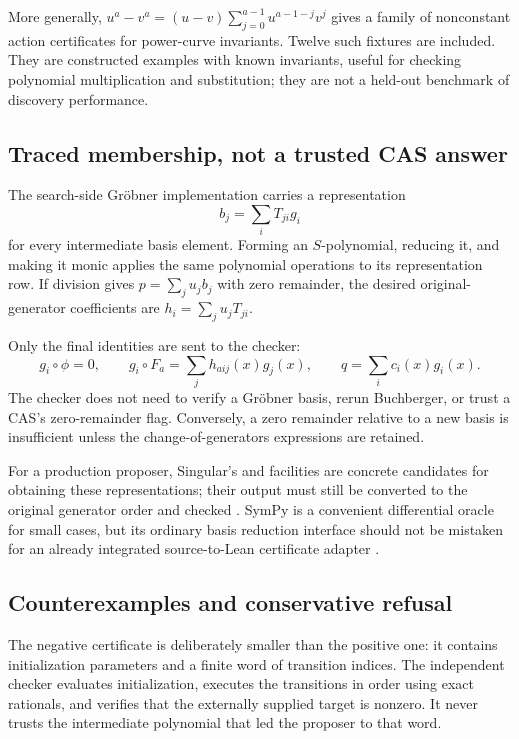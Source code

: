 More generally, $u^a-v^a=(u-v)\sum_{j=0}^{a-1}u^{a-1-j}v^j$ gives a family of
nonconstant action certificates for power-curve invariants. Twelve such fixtures
are included. They are constructed examples with known invariants, useful for
checking polynomial multiplication and substitution; they are not a held-out
benchmark of discovery performance.

\subsection{Traced membership, not a trusted CAS answer}

The search-side Gr\"obner implementation carries a representation
\[
 b_j=\sum_i T_{ji}g_i
\]
for every intermediate basis element. Forming an $S$-polynomial, reducing it,
and making it monic applies the same polynomial operations to its representation
row. If division gives $p=\sum_j u_j b_j$ with zero remainder, the desired
original-generator coefficients are $h_i=\sum_j u_jT_{ji}$.

Only the final identities are sent to the checker:
\begin{equation}\label{eq:idealcert}
 g_i\circ\phi=0,\qquad
 g_i\circ F_a=\sum_j h_{aij}(x)g_j(x),\qquad
 q=\sum_i c_i(x)g_i(x).
\end{equation}
The checker does not need to verify a Gr\"obner basis, rerun Buchberger, or trust
a CAS's zero-remainder flag. Conversely, a zero remainder relative to a new
basis is insufficient unless the change-of-generators expressions are retained.

For a production proposer, Singular's  and  facilities
are concrete candidates for obtaining these representations; their output must
still be converted to the original generator order and checked
\cite{singular}. SymPy is a convenient differential oracle for small cases, but
its ordinary basis reduction interface should not be mistaken for an already
integrated source-to-Lean certificate adapter \cite{sympy}.

\subsection{Counterexamples and conservative refusal}

The negative certificate is deliberately smaller than the positive one: it
contains initialization parameters and a finite word of transition indices.
The independent checker evaluates initialization, executes the transitions in
order using exact rationals, and verifies that the externally supplied target
is nonzero. It never trusts the intermediate polynomial that led the proposer
to that word.

